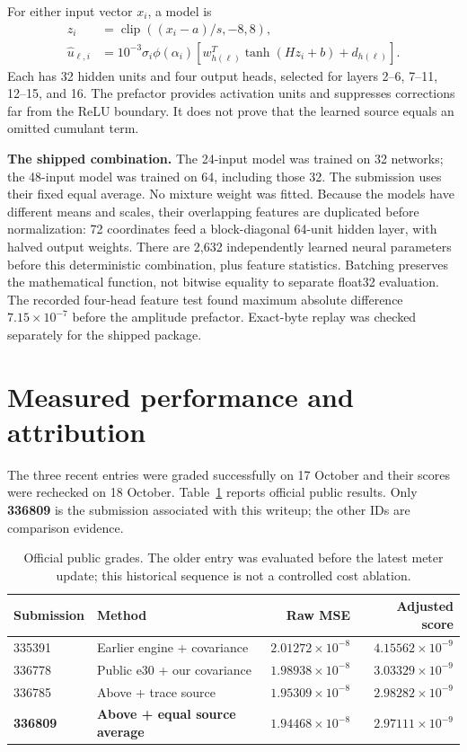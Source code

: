 \documentclass[10pt]{article}
\newcommand{\clip}{\operatorname{clip}}
\newcommand{\sectionpage}[1]{\clearpage\section{#1}}
\begin{document}
For either input vector \(x_i\), a model is
\begin{align}
 z_i&=\clip((x_i-a)/s,-8,8),\nonumber\\
 \widehat u_{\ell,i}&=10^{-3}\sigma_i\phi(\alpha_i)
       \left[w_{h(\ell)}^T\tanh(H z_i+b)+d_{h(\ell)}\right].\label{eq:nn}
\end{align}
Each has 32 hidden units and four output heads, selected for layers
2--6, 7--11, 12--15, and 16. The prefactor provides activation units and
suppresses corrections far from the ReLU boundary. It does not prove that the
learned source equals an omitted cumulant term.

\textbf{The shipped combination.} The 24-input model was trained on 32
networks; the 48-input model was trained on 64, including those 32. The
submission uses their fixed equal average. No mixture weight was fitted.
Because the models have different means and scales, their overlapping
features are duplicated before normalization: 72 coordinates feed a
block-diagonal 64-unit hidden layer, with halved output weights. There are
2,632 independently learned neural parameters before this deterministic
combination, plus feature statistics. Batching preserves the mathematical
function, not bitwise equality to separate float32 evaluation. The recorded
four-head feature test found maximum absolute difference
\(7.15\times10^{-7}\) before the amplitude prefactor. Exact-byte replay was
checked separately for the shipped package.

\sectionpage{Measured performance and attribution}
The three recent entries were graded successfully on 17 October and their
scores were rechecked on 18 October. Table~\ref{tab:official} reports official
public results. Only \textbf{336809} is the submission associated with this
writeup; the other IDs are comparison evidence.

\begin{table}[h]\centering\small
\begin{tabular}{@{}llrr@{}}\toprule
Submission & Method & Raw MSE & Adjusted score\\\midrule
335391 & Earlier engine + covariance & \(2.01272\!\times\!10^{-8}\) & \(4.15562\!\times\!10^{-9}\)\\
336778 & Public e30 + our covariance & \(1.98938\!\times\!10^{-8}\) & \(3.03329\!\times\!10^{-9}\)\\
336785 & Above + trace source & \(1.95309\!\times\!10^{-8}\) & \(2.98282\!\times\!10^{-9}\)\\
\textbf{336809} & \textbf{Above + equal source average} & \(1.94468\!\times\!10^{-8}\) & \(2.97111\!\times\!10^{-9}\)\\\bottomrule
\end{tabular}
\caption{Official public grades. The older entry was evaluated before the
latest meter update; this historical sequence is not a controlled cost ablation.}
\label{tab:official}
\end{table}
\end{document}
